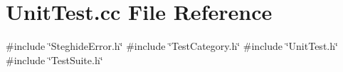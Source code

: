 \section{Unit\+Test.\+cc File Reference}
\label{UnitTest_8cc}
{\ttfamily \#include \char`\"{}Steghide\+Error.\+h\char`\"{}}\newline
{\ttfamily \#include \char`\"{}Test\+Category.\+h\char`\"{}}\newline
{\ttfamily \#include \char`\"{}Unit\+Test.\+h\char`\"{}}\newline
{\ttfamily \#include \char`\"{}Test\+Suite.\+h\char`\"{}}\newline
